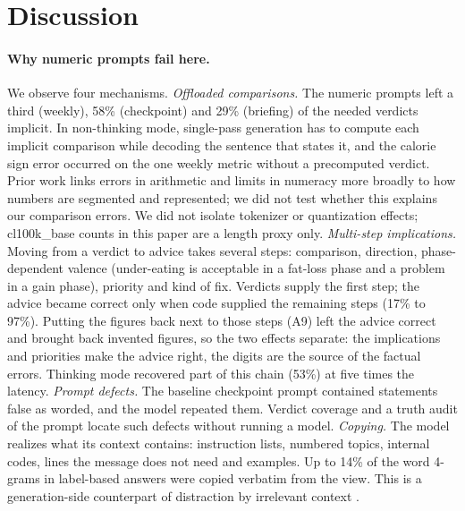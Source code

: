 \documentclass[10pt,twocolumn]{article}
\begin{document}
\section{Discussion}
\label{sec:discussion}

\paragraph{Why numeric prompts fail here.} We observe four mechanisms.
\emph{Offloaded comparisons.} The numeric prompts left a third (weekly), 58\% (checkpoint) and 29\% (briefing) of the
needed verdicts implicit. In non-thinking mode, single-pass generation has to compute each implicit comparison
while decoding the sentence that states it, and the calorie sign error occurred on the one weekly metric without a
precomputed verdict. Prior work links errors in arithmetic \citep{nogueira2021investigating,singh2024tokenization}
and limits in numeracy more broadly \citep{thawani2021representing} to how numbers are segmented and represented; we
did not test whether this explains our comparison errors. We did not isolate tokenizer or
quantization effects; cl100k\_base counts in this paper are a length proxy only.
\emph{Multi-step implications.} Moving from a verdict to advice takes several steps: comparison, direction,
phase-dependent valence (under-eating is acceptable in a fat-loss phase and a problem in a gain phase), priority and
kind of fix. Verdicts supply the first step; the advice became correct only when code supplied the remaining steps
(17\% to 97\%). Putting the figures back next to those steps (A9) left the advice correct and brought back invented
figures, so the two effects separate: the implications and priorities make the advice right, the digits are the source
of the factual errors. Thinking mode recovered part of this chain (53\%) at five times the latency.
\emph{Prompt defects.} The baseline checkpoint prompt contained statements false as worded, and the model repeated
them. Verdict coverage and a truth audit of the prompt locate such defects without running a model.
\emph{Copying.} The model realizes what its context contains: instruction lists, numbered topics, internal codes,
lines the message does not need and examples. Up to 14\% of the word 4-grams in label-based answers were copied
verbatim from the view. This is a generation-side counterpart of distraction by irrelevant context
\citep{shi2023distracted}.
\end{document}
